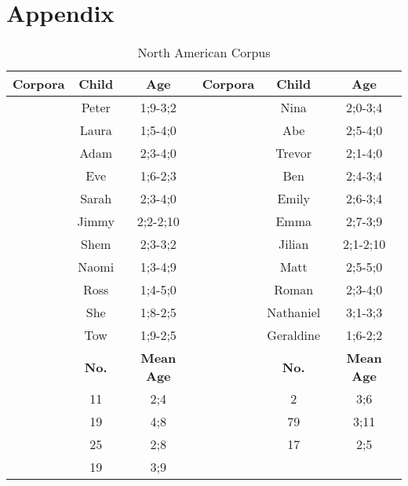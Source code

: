 \section{Appendix}
\begin{table}[]
\small
\centering
\caption{North American Corpus} 
\begin{tabular}{c|c|c|c|c|c}
\toprule
\textbf{Corpora}  & \textbf{Child}  & \textbf{Age} &
\textbf{Corpora}  & \textbf{Child}  & \textbf{Age}\\
\hline
\cite{bloom1974imitation}  & Peter   & 1;9-3;2 & \cite{suppes1974semantics} &  Nina & 2;0-3;4
\\
\cite{braunwald1971mother}  & Laura   & 1;5-4;0 & \cite{kuczaj1978children} &  Abe & 2;5-4;0 \\
\multirow{}{}{\cite{brown1973first}} & Adam & 2;3-4;0 & \cite{demetras1986working} & Trevor & 2;1-4;0\\
& Eve & 1;6-2;3 & \multirow{}{}{\cite{Weist2009}} & Ben & 2;4-3;4 \\
& Sarah & 2;3-4;0 & &Emily & 2;6-3;4\\
\cite{demetras1989changes} & Jimmy & 2;2-2;10 & & Emma & 2;7-3;9\\
\cite{clark1978awareness} & Shem & 2;3-3;2 &  & Jilian & 2;1-2;10\\
\cite{sachs1983talking}& Naomi & 1;3-4;9 & & Matt & 2;5-5;0\\
\cite{macwhinney2014childes} & Ross & 1;4-5;0 & & Roman & 2;3-4;0\\
\multirow{}{}{\cite{post1993language}}& She & 1;8-2;5 & \cite{Snow1990child} & Nathaniel & 3;1-3;3\\
&Tow&1;9-2;5&\cite{hayes1988vocabulary}&Geraldine&1;6-2;2\\
\hline
\hline
& \textbf{No.} & \textbf{Mean Age} & & \textbf{No.} & \textbf{Mean Age}\\
\cite{bates1991first}  & 11  & 2;4 &
\cite{bohannon1977children}  & 2 & 3;6\\
\cite{gleason1980acquisition}&19&4;8&\cite{snow1995shell}&79&3;11\\
\cite{snow1989imitativeness}&25&2;8&\cite{valian1991syntactic}&17&2;5\\
\cite{van1980effects}&19&3;9\\
\bottomrule
\end{tabular}
\end{table}
